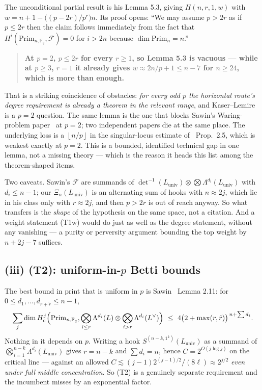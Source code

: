 \documentclass[10pt]{article}
\theoremstyle{plain}
\theoremstyle{definition}
\newcommand{\F}{\mathbb F}
\newcommand{\flr}[1]{\left\lfloor #1\right\rfloor}
\newcommand{\Prim}{\mathrm{Prim}}
\newcommand{\Luniv}{L_{\mathrm{univ}}}
\begin{document}
The unconditional partial result is his Lemma 5.3, giving
$H(n,r,1,w)$ with $w=n+1-\bigl((p-2r)/p^r\bigr)n$. Its proof opens: ``We may
assume $p>2r$ as if $p\le2r$ then the claim follows immediately from the fact
that $H^i(\Prim_{n,\F_q},\mathcal F)=0$ for $i>2n$ because $\dim\Prim_n=n$.''

\begin{quote}
\textbf{At $p=2$, $p\le2r$ for every $r\ge1$, so Lemma 5.3 is vacuous --- while
at $p\ge3$, $r=1$ it already gives $w\approx2n/p+1\le n-7$ for $n\ge24$, which
is more than enough.}
\end{quote}

That is a striking coincidence of obstacles: \emph{for every odd $p$ the
horizontal route's degree requirement is already a theorem in the relevant
range}, and Kaser--Lemire is a $p=2$ question. The same lemma is the one that
blocks Sawin's Waring-problem paper~\cite{SawinWaring} at $p=2$; two independent
papers die at the same place. The underlying loss is a $\flr{n/p}$ in the
singular-locus estimate of~\cite{Sawin1809} Prop.~2.5, which is weakest exactly
at $p=2$. This is a bounded, identified technical gap in one lemma, not a
missing theory --- which is the reason it heads this list among the theorem-shaped
items.

Two caveats. Sawin's $\mathcal F$ are summands of
$\det^{-1}(\Luniv)\otimes\bigotimes\Lambda^{d_i}(\Luniv)$ with $d_i\le n-1$;
our $\Xi_n(\Luniv)$ is an alternating sum of hooks with $n\approx2j$, which lie
in his class only with $r\approx2j$, and then $p>2r$ is out of reach anyway. So
what transfers is the \emph{shape} of the hypothesis on the same space, not a
citation. And a weight statement (T1w) would do just as well as the degree
statement, without any vanishing --- a purity or perversity argument bounding
the top weight by $n+2j-7$ suffices.

\subsection*{(iii) (T2): uniform-in-\texorpdfstring{$p$}{p} Betti bounds}

The best bound in print that is uniform in $p$ is Sawin~\cite{SawinH} Lemma
2.11: for $0\le d_1,\dots,d_{r+\tilde r}\le n-1$,
\[
 \sum_j\dim H^j_c\Bigl(\Prim_{n,\F_q},
 \bigotimes_{i\le r}\Lambda^{d_i}(L)\otimes\bigotimes_{i>r}\Lambda^{d_i}(L^{\vee})\Bigr)
 \ \le\ 4\bigl(2+\max(r,\tilde r)\bigr)^{\,n+\sum d_i}.
\]
Nothing in it depends on $p$. Writing a hook $S^{(n-k,1^k)}(\Luniv)$ as a
summand of $\bigotimes_{i=1}^{n-k}\Lambda^{d_i}(\Luniv)$ gives $r=n-k$ and
$\sum d_i=n$, hence $C=2^{O(j\log j)}$ on the critical line --- against an
allowed $C\lesssim(j-1)2^{(j-1)/2}/(8\ell)\approx2^{j/2}$ \emph{even under full
middle concentration}. So (T2) is a genuinely separate requirement and the
incumbent misses by an exponential factor.
\end{document}
